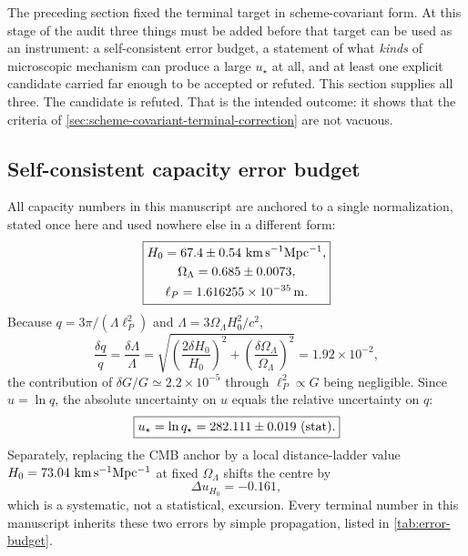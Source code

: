 \documentclass[aps,prd,reprint,nofootinbib,superscriptaddress,floatfix]{revtex4-2}
\numberwithin{equation}{section}
\theoremstyle{definition}
\theoremstyle{plain}
\begin{document}
The preceding section fixed the terminal target in scheme-covariant form.
At this stage of the audit three things must be added before that target can be used as an
instrument: a self-consistent error budget, a statement of what
\emph{kinds} of microscopic mechanism can produce a large \(u_\star\) at
all, and at least one explicit candidate carried far enough to be accepted
or refuted.  This section supplies all three.  The candidate is refuted.
That is the intended outcome: it shows that the criteria of
\cref{sec:scheme-covariant-terminal-correction} are not vacuous.

\subsection{Self-consistent capacity error budget}

All capacity numbers in this manuscript are anchored to a single
normalization, stated once here and used nowhere else in a different form:
\begin{equation}
\boxed{
\begin{gathered}
H_0=67.4\pm0.54\ {\rm km\,s^{-1}Mpc^{-1}},\\
\Omega_\Lambda=0.685\pm0.0073,\\
\ell_P=1.616255\times10^{-35}\,{\rm m}.
\end{gathered}}
\label{eq:capacity-anchor}
\end{equation}
Because \(q=3\pi/(\Lambda\ell_P^2)\) and \(\Lambda=3\Omega_\Lambda H_0^2/c^2\),
\begin{equation}
\frac{\delta q}{q}
=\frac{\delta\Lambda}{\Lambda}
=\sqrt{\left(\frac{2\delta H_0}{H_0}\right)^2
+\left(\frac{\delta\Omega_\Lambda}{\Omega_\Lambda}\right)^2}
=1.92\times10^{-2},
\end{equation}
the contribution of \(\delta G/G\simeq2.2\times10^{-5}\) through
\(\ell_P^2\propto G\) being negligible.  Since \(u=\ln q\), the absolute
uncertainty on \(u\) equals the relative uncertainty on \(q\):
\begin{equation}
\boxed{
u_\star=\ln q_\star=282.111\pm0.019\ ({\rm stat}).
}
\end{equation}
Separately, replacing the CMB anchor by a local distance-ladder value
\(H_0=73.04\ {\rm km\,s^{-1}Mpc^{-1}}\) at fixed \(\Omega_\Lambda\) shifts the
centre by
\begin{equation}
\Delta u_{H_0}=-0.161,
\end{equation}
which is a systematic, not a statistical, excursion.  Every terminal number
in this manuscript inherits these two errors by simple propagation, listed in
\cref{tab:error-budget}.
\end{document}
